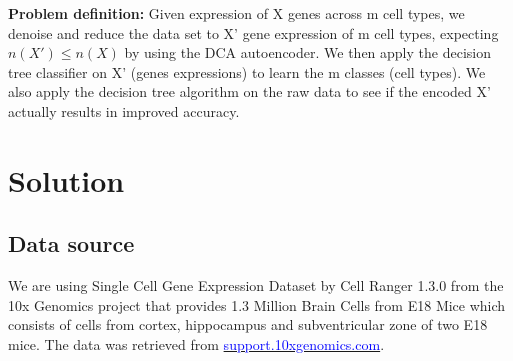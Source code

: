 \textbf{Problem definition:} Given expression of X genes across m cell types, we denoise and reduce the data set to X' gene expression of m cell types, expecting $n(X') \leq n(X)$ by using the DCA autoencoder. We then apply the decision tree classifier on X' (genes expressions) to learn the m classes (cell types). We also apply the decision tree algorithm on the raw data to see if the encoded X' actually results in improved accuracy.

\section*{Solution}

\subsection*{Data source}
We are using Single Cell Gene Expression Dataset by Cell Ranger 1.3.0 from the 10x Genomics project that provides 1.3 Million Brain Cells from E18 Mice which consists of cells from cortex, hippocampus and subventricular zone of two E18 mice. The data was retrieved from \href{https://support.10xgenomics.com/single-cell-gene-expression/datasets/1.3.0/1M_neurons}{\textcolor{blue}{support.10xgenomics.com}}.

